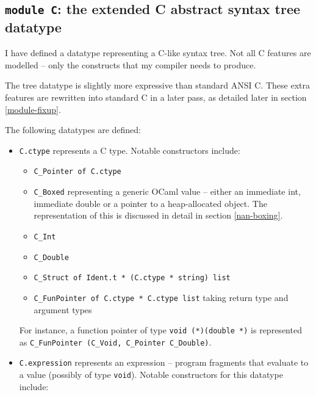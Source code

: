 \documentclass[12pt,a4paper,twoside,openright]{report}
\begin{document}
\subsection{\texttt{module C}: the extended C abstract syntax tree datatype}

I have defined a datatype representing a C-like syntax tree. Not all C features
are modelled -- only the constructs that my compiler needs to produce.

The tree datatype is slightly more expressive than standard ANSI C. These extra
features are rewritten into standard C in a later pass, as detailed later in
section \ref{module-fixup}.

The following datatypes are defined:

\begin{itemize}
  \item
    \lstinline!C.ctype! represents a C type. Notable constructors include:

    \begin{itemize}
        \item \lstinline!C_Pointer of C.ctype!
        \item \lstinline!C_Boxed! representing a generic OCaml value -- either
            an immediate int, immediate double or a pointer to a heap-allocated
            object. The representation of this is discussed in detail in
            section \ref{nan-boxing}.
        \item \lstinline!C_Int!
        \item \lstinline!C_Double!
        \item \lstinline!C_Struct of Ident.t * (C.ctype * string) list!
        \item \lstinline!C_FunPointer of C.ctype * C.ctype list! taking return
            type and argument types
    \end{itemize}

    For instance, a function pointer of type \lstinline!void (*)(double *)! is
    represented as \lstinline!C_FunPointer (C_Void, C_Pointer C_Double)!.
  \item
    \lstinline!C.expression! represents an expression -- program fragments that
    evaluate to a value (possibly of type \lstinline!void!). Notable
    constructors for this datatype include:


\end{itemize}
\end{document}
